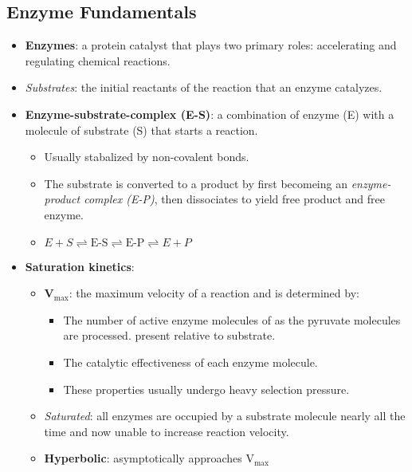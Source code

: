 \documentclass[12pt,a4paper]{article}
\begin{document}
\subsection{Enzyme Fundamentals}
\begin{itemize}
    \item \textbf{Enzymes}: a protein catalyst that plays two primary roles: {\color{o-Sun}accelerating} and {\color{o-Sun}regulating} chemical reactions. 
    \item \textit{Substrates}: the initial reactants of the reaction that an enzyme catalyzes.
    \item \textbf{Enzyme-substrate-complex (E-S)}: a combination of enzyme (E) with a molecule of substrate (S) that starts a reaction.
        \begin{itemize}
            \item Usually stabalized by {\color{o-Sun}non-covalent} bonds.
            \item The substrate is converted to a product by first becomeing an \textit{enzyme-product complex (E-P)}, then dissociates to yield free product and free enzyme.
            \item {\color{o-Sun}\(E+S\rightleftharpoons \text{E-S} \rightleftharpoons \text{E-P} \rightleftharpoons E + P\)}
        \end{itemize}
    \item \textbf{Saturation kinetics}:
        \begin{itemize}
            \item \textbf{V\(_{\text{max}}\)}: the maximum velocity of a reaction and is determined by:
                \begin{itemize}
                    \item The {\color{o-Sun}number} of active enzyme molecules of  as the pyruvate molecules are processed. present relative to substrate.
                    \item The catalytic {\color{o-Sun}effectiveness} of each enzyme molecule.
                    \item These properties usually undergo heavy selection pressure.
                \end{itemize}
            \item \textit{Saturated}: all enzymes are occupied by a substrate molecule nearly all the time and now unable to increase reaction velocity.
            \item \textbf{Hyperbolic}: asymptotically approaches V\(_{\text{max}}\)
                \begin{itemize}

\end{itemize}
\end{itemize}
\end{itemize}
\end{document}
